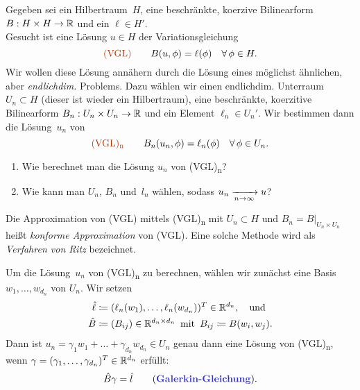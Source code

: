 \documentclass{cheat-sheet}
\newcommand{\tss}[1]{\textsubscript{#1}} %
\newcommand{\probl}[1]{\textcolor{ProblemColor}{#1}}
\begin{document}
\begin{verf}
  Gegeben sei ein Hilbertraum~$H$, eine beschränkte, koerzive Bilinearform $B : H \times H \to \mathbb{R}$ und ein $\ell \in H'$. \\
  Gesucht ist eine Lösung $u \in H$ der Variationsgleichung
  \[
    \text{\probl{(VGL)}} \qquad
    B(u, \phi) = \ell(\phi) \quad
    \forall \, \phi \in H.
  \]
  Wir wollen diese Lösung annähern durch die Lösung eines möglichst ähnlichen, aber \textit{endlichdim.} Problems.
  Dazu wählen wir einen endlichdim. Unterraum $U_n \subset H$ (dieser ist wieder ein Hilbertraum), eine beschränkte, koerzitive Bilinearform $B_n : U_n \times U_n \to \mathbb{R}$ und ein Element $\ell_n \in U_n'$.
  Wir bestimmen dann die Lösung~$u_n$ von
  \[
    \text{\probl{(VGL)\tss{n}}} \qquad
    B_n(u_n, \phi) = \ell_n(\phi) \quad
    \forall \, \phi \in U_n.
  \]
\end{verf}

\begin{fragen}
  \begin{enumerate}
    \item Wie berechnet man die Lösung $u_n$ von (VGL)\tss{n}?
    \item Wie kann man $U_n$, $B_n$ und~$l_n$ wählen, sodass $u_n \xrightarrow[n \to \infty]{} u$?
  \end{enumerate}
\end{fragen}

\begin{defn}
  Die Approximation von (VGL) mittels (VGL)\tss{n} mit $U_n \subset H$ und $B_n = B|_{U_n \times U_n}$ heißt \emph{konforme Approximation} von (VGL).
  Eine solche Methode wird als \emph{Verfahren von Ritz} bezeichnet.
\end{defn}

\begin{vorgehen}
  Um die Lösung~$u_n$ von (VGL)\tss{n} zu berechnen, wählen wir zunächst eine Basis $w_1, \ldots, w_{d_n}$ von $U_n$.
  Wir setzen
  \begin{align*}
    \hat{\ell} & \coloneqq (\ell_n(w_1), \ldots, \ell_n(w_{d_n}))^T \in \mathbb{R}^{d_n}, \quad \text{und} \\
    \hat{B} & \coloneqq (B_{ij}) \in \mathbb{R}^{d_n \times d_n}
    \enspace \text{mit} \enspace
    B_{ij} \coloneqq B(w_i, w_j).
  \end{align*}
  Dann ist $u_n = \gamma_1 w_1 + \ldots + \gamma_{d_n} w_{d_n} \in U_n$ genau dann eine Lösung von (VGL)\tss{n}, wenn $\gamma = (\gamma_1, \ldots, \gamma_{d_n})^T \in \mathbb{R}^{d_n}$ erfüllt:
  \[
    \hat{B} \gamma = \hat{l} \qquad
    \text{(\emph{Galerkin-Gleichung})}.
  \]
\end{vorgehen}
\end{document}
